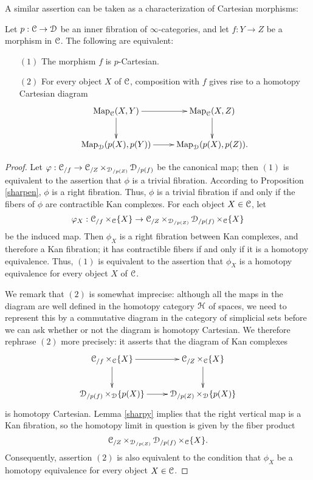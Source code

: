 A similar assertion can be taken as a characterization of Cartesian morphisms:

\begin{proposition}\label{charCart}
Let $p: \operatorname{\mathcal{C}} \rightarrow \operatorname{\mathcal{D}}$ be an inner fibration of $\infty$-categories, and let
$f: Y \rightarrow Z$ be a morphism in $\operatorname{\mathcal{C}}$. The following are equivalent:
\begin{itemize}
\item[$(1)$] The morphism $f$ is $p$-Cartesian.
\item[$(2)$] For every object $X$ of $\operatorname{\mathcal{C}}$, composition with $f$ gives rise to a homotopy
Cartesian diagram
$$ \xymatrix{ \bHom_{\calC}(X,Y) \ar[r] \ar[d] & \bHom_{\calC}(X,Z) \ar[d] \\
\bHom_{\calD}( p(X), p(Y) ) \ar[r] & \bHom_{\calD}(p(X), p(Z)).} $$
\end{itemize}
\end{proposition}

\begin{proof}
Let $\varphi: \operatorname{\mathcal{C}}_{/f} \rightarrow \operatorname{\mathcal{C}}_{/Z} \times_{\operatorname{\mathcal{D}}_{/p(Z)}} \operatorname{\mathcal{D}}_{/p(f)}$ be the canonical map; then $(1)$ is equivalent to the assertion that $\phi$ is a trivial fibration. According to Proposition \ref{sharpen}, $\phi$ is a right fibration. Thus, $\phi$ is a trivial fibration if and only if the fibers of $\phi$ are contractible Kan complexes. For each object $X \in \operatorname{\mathcal{C}}$, let 
$$\varphi_X:  \operatorname{\mathcal{C}}_{/f} \times_{\operatorname{\mathcal{C}}} \{X \} \rightarrow \operatorname{\mathcal{C}}_{/Z} \times_{\operatorname{\mathcal{D}}_{/p(Z)}} \operatorname{\mathcal{D}}_{/p(f)}
\times_{\operatorname{\mathcal{C}}} \{X\}$$ be the induced map. Then $\phi_{X}$ is a right fibration between Kan complexes, and therefore a Kan fibration; it has contractible fibers if and only if it is a homotopy equivalence. Thus, $(1)$ is equivalent to the assertion that $\phi_{X}$ is a homotopy equivalence for every object $X$ of $\operatorname{\mathcal{C}}$.

We remark that $(2)$ is somewhat imprecise: although all the maps in the diagram are well defined in the homotopy category $\operatorname{\mathcal{H}}$ of spaces, we need to represent this by a commutative diagram in the category of simplicial sets before we can ask whether or not the diagram is homotopy Cartesian. We therefore rephrase $(2)$ more precisely: it asserts that the diagram of Kan complexes
$$ \xymatrix{ \calC_{/f} \times_{\calC} \{X\} \ar[r] \ar[d] & \calC_{/Z} \times_{\calC} \{X\} \ar[d] \\
\calD_{/p(f)} \times_{\calD} \{p(X)\} \ar[r] & \calD_{/p(Z)} \times_{\calD} \{p(X)\} }$$
is homotopy Cartesian. Lemma \ref{sharpy} implies that the right vertical map is a Kan fibration, so the homotopy limit in question is given by the fiber product $$\operatorname{\mathcal{C}}_{/Z} \times_{\operatorname{\mathcal{D}}_{/p(Z)}} \operatorname{\mathcal{D}}_{/p(f)} \times_{\operatorname{\mathcal{C}}} \{X\}.$$ 
Consequently, assertion $(2)$ is also equivalent to the condition that
$\phi_{X}$ be a homotopy equivalence for every object $X \in \operatorname{\mathcal{C}}$.
\end{proof}

